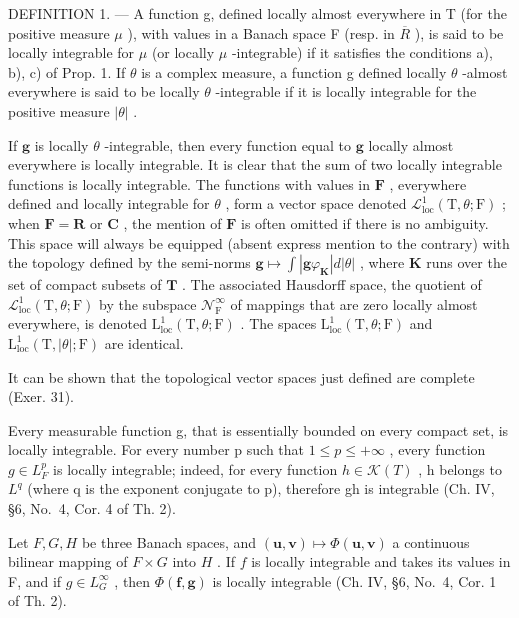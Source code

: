 DEFINITION 1. --- A function g, defined locally almost everywhere in T (for the positive measure \(\mu\) ), with values in a Banach space F (resp. in \(\overline{R}\) ), is said to be locally integrable for \(\mu\) (or locally \(\mu\) -integrable) if it satisfies the conditions a), b), c) of Prop. 1. If \(\theta\) is a complex measure, a function g defined locally \(\theta\) -almost everywhere is said to be locally \(\theta\) -integrable if it is locally integrable for the positive measure \(|\theta|\) .

If \(\mathbf{g}\) is locally \(\theta\) -integrable, then every function equal to \(\mathbf{g}\) locally almost everywhere is locally integrable. It is clear that the sum of two locally integrable functions is locally integrable. The functions with values in \(\mathbf{F}\) , everywhere defined and locally integrable for \(\theta\) , form a vector space denoted \(\mathcal{L}_{\mathrm{loc}}^{1}(\mathrm{T},\theta ;\mathrm{F})\) ; when \(\mathbf{F} = \mathbf{R}\) or \(\mathbf{C}\) , the mention of \(\mathbf{F}\) is often omitted if there is no ambiguity. This space will always be equipped (absent express mention to the contrary) with the topology defined by the semi-norms \(\mathbf{g}\mapsto \int |\mathbf{g}\varphi_{\mathbf{K}}|d|\theta |\) , where \(\mathbf{K}\) runs over the set of compact subsets of \(\mathbf{T}\) . The associated Hausdorff space, the quotient of \(\mathcal{L}_{\mathrm{loc}}^{1}(\mathrm{T},\theta ;\mathrm{F})\) by the subspace \(\mathcal{N}_{\mathrm{F}}^{\infty}\) of mappings that are zero locally almost everywhere, is denoted \(\mathrm{L}_{\mathrm{loc}}^{1}(\mathrm{T},\theta ;\mathrm{F})\) . The spaces \(\mathrm{L}_{\mathrm{loc}}^{1}(\mathrm{T},\theta ;\mathrm{F})\) and \(\mathrm{L}_{\mathrm{loc}}^{1}(\mathrm{T},|\theta |; \mathrm{F})\) are identical.

It can be shown that the topological vector spaces just defined are complete (Exer. 31).

Every measurable function g, that is essentially bounded on every compact set, is locally integrable. For every number p such that \(1 \leqslant p \leqslant +\infty\) , every function \(g \in L_{F}^{p}\) is locally integrable; indeed, for every function \(h \in \mathcal{K}(T)\) , h belongs to \(L^{q}\) (where q is the exponent conjugate to p), therefore gh is integrable (Ch. IV, §6, No.~4, Cor. 4 of Th. 2).

Let \(F, G, H\) be three Banach spaces, and \((\mathbf{u}, \mathbf{v}) \mapsto \Phi(\mathbf{u}, \mathbf{v})\) a continuous bilinear mapping of \(F \times G\) into \(H\) . If \(f\) is locally integrable and takes its values in F, and if \(g \in L_{G}^{\infty}\) , then \(\Phi(\mathbf{f}, \mathbf{g})\) is locally integrable (Ch. IV, §6, No.~4, Cor. 1 of Th. 2).


